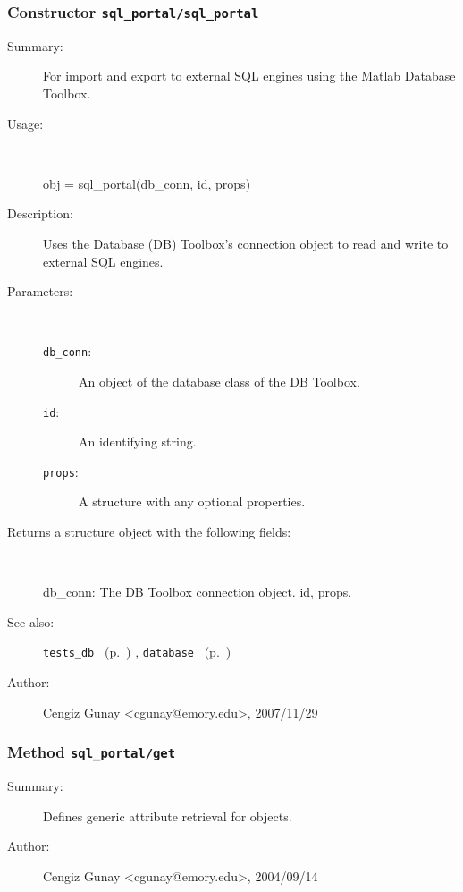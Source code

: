 \subsubsection[Constructor \texttt{sql\_portal}]{Constructor \texttt{sql\_portal/sql\_portal}}%
%
\label{ref_sql_portal__sql_portal}%
\hypertarget{ref_sql_portal__sql_portal}{}%
\begin{description}
\item[Summary:]For import and export to external SQL engines using the Matlab Database Toolbox.
%
\item[Usage:]~%
\begin{lyxcode}%
obj = sql\_portal(db\_conn, id, props)
%
\end{lyxcode}%
%
\item[Description:]%
Uses the Database (DB) Toolbox's connection object to read and write to
 external SQL engines.
\item[Parameters:]~
\begin{description}%
\item[\texttt{db\_conn}:]
 An object of the database class of the DB Toolbox.
\item[\texttt{id}:]
 An identifying string.
\item[\texttt{props}:]
 A structure with any optional properties.
\end{description}%
%
\item[Returns a structure object with the following fields:
]~

	db\_conn: The DB Toolbox connection object.
	id, props.
%
%
\item[See also:]%
\hyperlink{ref_tests_db}{\texttt{tests\_db}}%
\ (p.~\pageref{ref_tests_db})%
%
, \hyperlink{ref_database}{\texttt{database}}%
\ (p.~\pageref{ref_database})%
%
%
\item[Author:]%
Cengiz Gunay <cgunay@emory.edu>, 2007/11/29
%
\end{description}
\methodline%
\subsubsection[Method \texttt{get}]{Method \texttt{sql\_portal/get}}%
%
\label{ref_sql_portal__get}%
\hypertarget{ref_sql_portal__get}{}%
\begin{description}
\item[Summary:]Defines generic attribute retrieval for objects.
%
%
%
%
%
%
%
\item[Author:]%
Cengiz Gunay <cgunay@emory.edu>, 2004/09/14
%
\end{description}
\methodline%
